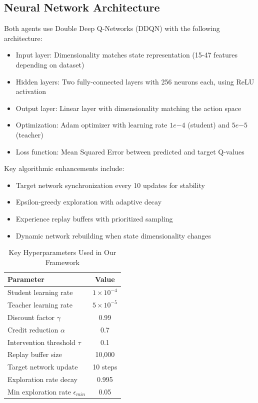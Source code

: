 \documentclass[twoside,11pt]{article}
\begin{document}
\subsection{Neural Network Architecture}

Both agents use Double Deep Q-Networks (DDQN) with the following architecture:

\begin{itemize}
    \item Input layer: Dimensionality matches state representation (15-47 features depending on dataset)
    \item Hidden layers: Two fully-connected layers with 256 neurons each, using ReLU activation
    \item Output layer: Linear layer with dimensionality matching the action space
    \item Optimization: Adam optimizer with learning rate $1e{-4}$ (student) and $5e{-5}$ (teacher)
    \item Loss function: Mean Squared Error between predicted and target Q-values
\end{itemize}

Key algorithmic enhancements include:
\begin{itemize}
    \item Target network synchronization every 10 updates for stability
    \item Epsilon-greedy exploration with adaptive decay
    \item Experience replay buffers with prioritized sampling
    \item Dynamic network rebuilding when state dimensionality changes
\end{itemize}

\begin{table}[h]
\centering
\caption{Key Hyperparameters Used in Our Framework}
\label{tab:hyperparams}
\begin{tabular}{lc}
\toprule
\textbf{Parameter} & \textbf{Value} \\
\midrule
Student learning rate & $1 \times 10^{-4}$ \\
Teacher learning rate & $5 \times 10^{-5}$ \\
Discount factor $\gamma$ & 0.99 \\
Credit reduction $\alpha$ & 0.7 \\
Intervention threshold $\tau$ & 0.1 \\
Replay buffer size & 10,000 \\
Target network update & 10 steps \\
Exploration rate decay & 0.995 \\
Min exploration rate $\epsilon_{min}$ & 0.05 \\
\bottomrule
\end{tabular}
\end{table}
\end{document}
